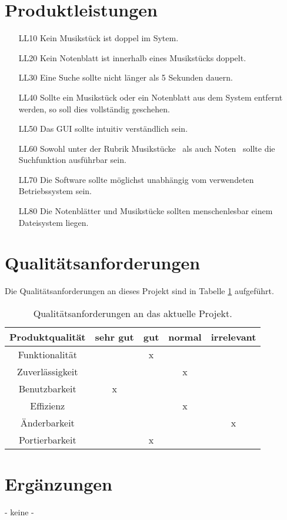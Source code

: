 \documentclass[a4paper,10pt]{scrartcl}
\begin{document}
\section{Produktleistungen}
\begin{enumerate}
\item[LL10] Kein Musikstück ist doppel im Sytem.
\item[LL20] Kein Notenblatt ist innerhalb eines Musikstücks doppelt.
\item[LL30] Eine Suche sollte nicht länger als 5 Sekunden dauern.
\item[LL40] Sollte ein Musikstück oder ein Notenblatt aus dem System entfernt werden, so soll dies vollständig geschehen.
\item[LL50] Das GUI sollte intuitiv verständlich sein.
\item[LL60] Sowohl unter der Rubrik \glqq Musikstücke\grqq~  als auch \glqq Noten\grqq~ sollte die Suchfunktion ausführbar sein.
\item[LL70] Die Software sollte möglichst unabhängig vom verwendeten Betriebssystem sein.
\item[LL80] Die Notenblätter und Musikstücke sollten menschenlesbar einem Dateisystem liegen.
\end{enumerate}
\section{Qualitätsanforderungen}
Die Qualitätsanforderungen an dieses Projekt sind in Tabelle \ref{Tab. Qualitaetsanforderungen} aufgeführt.
\begin{table}
\centering
\begin{tabular}{| c | c | c | c | c |}
\hline
Produktqualität &	sehr gut&	gut & normal& irrelevant \\
\hline
\hline
Funktionalität	&			&	x	&		&		\\
\hline
Zuverlässigkeit	&			&		&	x	&		\\
\hline
Benutzbarkeit	&	x		&		&		&		\\
\hline
Effizienz		&			&		&	x	&		\\
\hline
Änderbarkeit	&			&		&		&	x	\\
\hline
Portierbarkeit	&			&	x	&		&		\\
\hline
\end{tabular}
\caption{Qualitätsanforderungen an das aktuelle Projekt.}
\label{Tab. Qualitaetsanforderungen}
\end{table}
\section{Ergänzungen}
\begin{center}
- keine -
\end{center}
\end{document}

